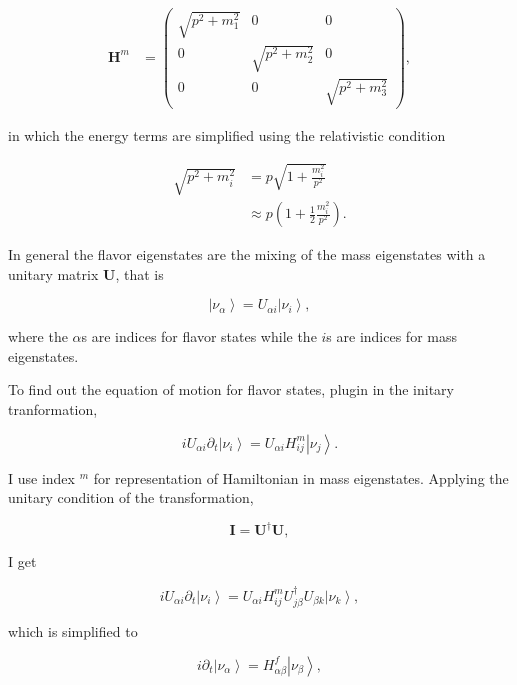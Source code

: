 \documentclass{tufte-handout}
\newcommand{\ket}[1]{\left| #1\right\rangle}
\begin{document}
\begin{align*}
\mathbf H^m &= \begin{pmatrix}\sqrt{p^2 + m_1^2} & 0 & 0 \\ 0& \sqrt{p^2 + m_2^2} & 0 \\ 0 & 0 & \sqrt{p^2 + m_3^2}  \end{pmatrix},
\end{align*}

in which the energy terms are simplified using the relativistic condition

\begin{align}
\sqrt{p^2+m_i^2} & = p\sqrt{1 + \frac{m_i^2}{p^2}} \\
&\approx  p(1 + \frac{1}{2} \frac{m_i^2}{p^2}).
\end{align}


In general the flavor eigenstates are the mixing of the mass eigenstates with a unitary matrix $\mathbf U$, that is

\begin{equation}
\ket{\nu_{\alpha}} =  U_{\alpha i} \ket{\nu_i},
\end{equation}

where the $\alpha$s are indices for flavor states while the $i$s are indices for mass eigenstates.

To find out the equation of motion for flavor states, plugin in the initary tranformation,

\begin{equation}
i  U_{\alpha i} \partial_t \ket{\nu_i} =  U_{\alpha i}  H^m_{ij} \ket{\nu_j}.
\end{equation}

I use index ${}^m$ for representation of Hamiltonian in mass eigenstates. Applying the unitary condition of the transformation,

\begin{equation}
\mathbf I = \mathbf {U^\dagger} \mathbf U,
\end{equation}

I get

\begin{equation}
i U_{\alpha i} \partial_t \ket{\nu_i} =  U_{\alpha i} H^m_{i j}  {U^\dagger_{j\beta}}  U_{\beta k} \ket{\nu_k},
\end{equation}

which is simplified to

\begin{equation}
i \partial_t \ket{\nu_\alpha} = H^f_{\alpha \beta} \ket{\nu_{\beta}},
\end{equation}
\end{document}
